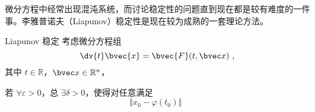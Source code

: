 
\begin{issues}
\issueMissDepend
\end{issues}

微分方程中经常出现混沌系统，而讨论稳定性的问题直到现在都是较有难度的一件事。李雅普诺夫（Liapunov）稳定性是现在较为成熟的一套理论方法。

\begin{definition}{Liapunov 稳定}
考虑微分方程组 
\begin{equation}
\dv{t} \bvec{x} = \bvec{F}(t, \bvec x) ~,
\end{equation}
其中 $t \in \mathbb R$，$\bvec x \in \mathbb R^n$，



若 $\forall \varepsilon > 0$，总 $\exists \delta > 0$，使得对任意满足 
\begin{equation}
\Vert x_0 - \varphi(t_0)\Vert ~~
\end{equation}

\end{definition}